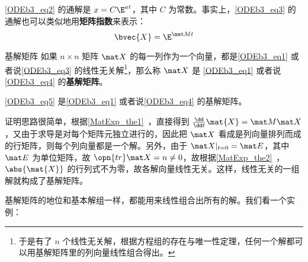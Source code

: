 \autoref{ODEb3_eq2} 的通解是 $x=C\E^{at}$，其中 $C$ 为常数。事实上，\autoref{ODEb3_eq3} 的通解也可以类似地用\textbf{矩阵指数}来表示：
\begin{equation}\label{ODEb3_eq5}
\bvec{X}=\E^{\mat Mt}
\end{equation}

\begin{definition}{基解矩阵}
如果 $n\times n$ 矩阵 $\mat X$ 的每一列作为一个向量，都是\autoref{ODEb3_eq1} 或者说\autoref{ODEb3_eq3} 的线性无关解\footnote{于是有了 $n$ 个线性无关解，根据方程组的存在与唯一性定理，任何一个解都可以用基解矩阵里的列向量线性组合得出。}，那么称 $\mat X$ 是 \autoref{ODEb3_eq1} 或者说\autoref{ODEb3_eq4} 的\textbf{基解矩阵}。
\end{definition}

\begin{theorem}{}
\autoref{ODEb3_eq5} 是\autoref{ODEb3_eq1} 或者说\autoref{ODEb3_eq4} 的基解矩阵。
\end{theorem}

证明思路很简单，根据\autoref{MatExp_the1}~，直接得到 $\frac{\dd}{\dd t}\mat{X}=\mat M\mat X$，又由于求导是对每个矩阵元独立进行的，因此把 $\mat X$ 看成是列向量排列而成的行矩阵，则每个列向量都是一个解。另外，由于 $\mat X|_{t=0}=\mat E$，其中 $\mat E$ 为单位矩阵，故 $\opn{tr}\mat X=n\not=0$，故根据\autoref{MatExp_the2}~，$\abs{\mat{X}}$ 的行列式不为零，故各解向量线性无关。这样，线性无关的一组解就构成了基解矩阵。


基解矩阵的地位和基本解组一样，都能用来线性组合出所有的解。我们看一个实例：

